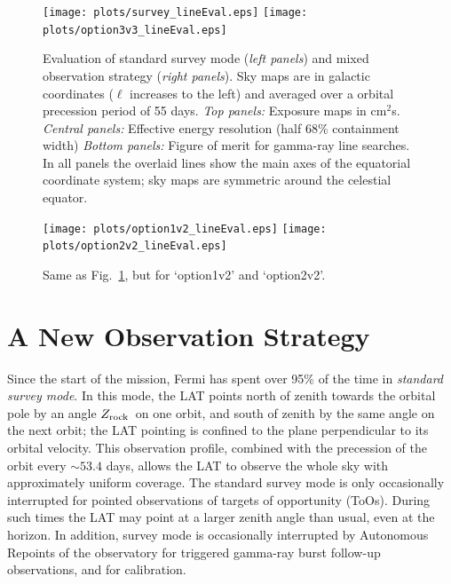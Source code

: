 \documentclass[aps,prd,superscriptaddress,nofootinbib,fixlfloat, 12pt]{revtex4-1}
\newcommand{\Fermi}{{\slshape Fermi}}
\newcommand{\zrock}{$Z_{\rm rock}$}
\begin{document}
\begin{figure}[t]
  \begin{center}
    \texttt{[image: plots/survey\_lineEval.eps]}
    \texttt{[image: plots/option3v3\_lineEval.eps]}
    \vspace{-0.5cm}
  \end{center}
  \caption{Evaluation of standard survey mode (\emph{left panels}) and mixed observation
    strategy (\emph{right panels}). Sky maps are in galactic coordinates ($\ell$ increases
    to the left) and averaged over a orbital precession period of 55 days.
    \emph{Top
      panels:} Exposure maps in cm$^2$s.
    \emph{Central panels:}
    Effective energy resolution (half 68\% containment width)
  \emph{Bottom panels:} Figure of merit for gamma-ray line searches. In all
  panels the overlaid lines show the main axes of the equatorial coordinate
  system; sky maps are symmetric around the celestial equator.}
  \label{fig:mollweide}
\end{figure}

\begin{figure}[t]
  \begin{center}
    \texttt{[image: plots/option1v2\_lineEval.eps]}
    \texttt{[image: plots/option2v2\_lineEval.eps]}
    \vspace{-0.5cm}
  \end{center}
  \caption{Same as Fig.~\ref{fig:mollweide}, but for `option1v2' and
  `option2v2'.}
  \label{fig:mollweide2}
\end{figure}

\section{A New Observation Strategy}
Since the start of the mission, Fermi has spent over 95\% of the time in
\emph{standard survey mode}.
In this mode, the LAT points north of zenith towards the orbital pole by an
angle \zrock\ on one orbit, and south of zenith by the same angle on the next
orbit; the LAT pointing is confined to the plane perpendicular to its orbital
velocity. 
This observation profile, combined with the precession of the orbit every
$\sim53.4$ days, allows the LAT to observe the whole sky with approximately
uniform coverage. The standard survey mode is only occasionally interrupted
for pointed observations of targets of opportunity (ToOs). During such times
the LAT may point at a larger zenith angle than usual, even at the horizon.  In
addition, survey mode is occasionally interrupted by Autonomous Repoints of
the observatory for triggered gamma-ray burst follow-up observations, and for
calibration.
\end{document}
